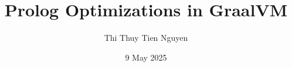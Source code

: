 \documentclass[instructions]{./Packages/uqthesis}
\title{Prolog Optimizations in GraalVM}
\author{Thi Thuy Tien Nguyen}
\date{9 May 2025}
\begin{document}
\maketitle
\thispagestyle{empty}
\clearpage


\thispagestyle{empty}
\clearpage

\renewcommand{\sectionmark}[1]{\markboth{\thesection~#1}{}}

\frontmatter
\openany

\begin{KeepFromToc}
    \setcounter{page}{0} %
    \tableofcontents
    \newpage
    \listoffigures
    \newpage
    \listoftables
\end{KeepFromToc}
  \let\cleardoublepage\clearpage

\mainmatter













\end{document}
